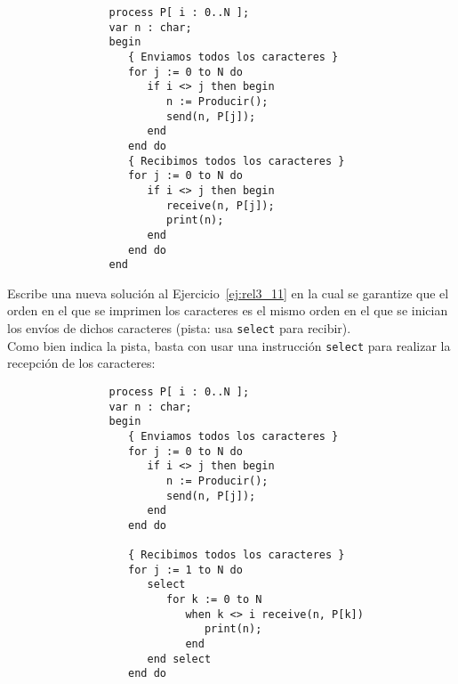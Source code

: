 \begin{ejercicio}
\begin{itemize}
\begin{verbatim}
                process P[ i : 0..N ];
                var n : char;
                begin
                   { Enviamos todos los caracteres }
                   for j := 0 to N do
                      if i <> j then begin
                         n := Producir();
                         send(n, P[j]);
                      end
                   end do
                   { Recibimos todos los caracteres }
                   for j := 0 to N do
                      if i <> j then begin
                         receive(n, P[j]);
                         print(n);
                      end
                   end do
                end
            \end{verbatim}
    \end{itemize}
\end{ejercicio}

\begin{ejercicio}\label{ej:rel3_12}
    Escribe una nueva solución al Ejercicio~\ref{ej:rel3_11} en la cual se garantize que el orden en el que se imprimen los caracteres es el mismo orden en el que se inician los envíos de dichos caracteres (pista: usa \verb|select| para recibir).\\

    Como bien indica la pista, basta con usar una instrucción \verb|select| para realizar la recepción de los caracteres:
            \begin{verbatim}
                process P[ i : 0..N ];
                var n : char;
                begin
                   { Enviamos todos los caracteres }
                   for j := 0 to N do
                      if i <> j then begin
                         n := Producir();
                         send(n, P[j]);
                      end
                   end do

                   { Recibimos todos los caracteres }
                   for j := 1 to N do
                      select
                         for k := 0 to N
                            when k <> i receive(n, P[k])
                               print(n);
                            end
                      end select
                   end do
            \end{verbatim}
\end{ejercicio}

